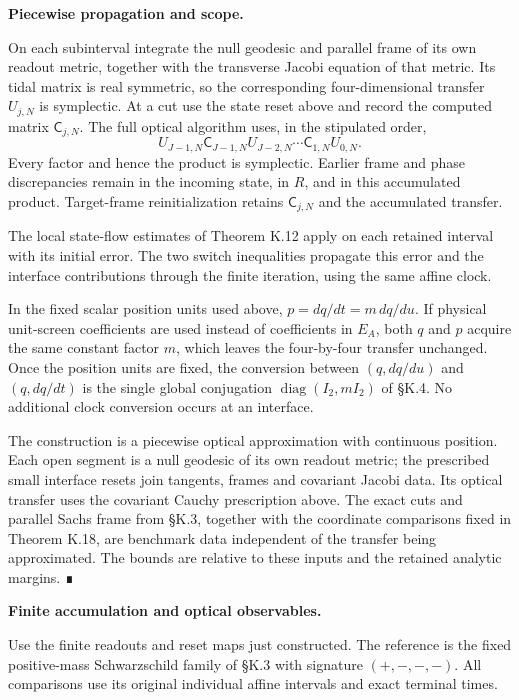 \documentclass[
  english,
  11pt,
  reqno]{amsart}
\begin{document}
\textbf{Piecewise propagation and scope.}

On each subinterval integrate the null geodesic and parallel frame of
its own readout metric, together with the transverse Jacobi equation of
that metric. Its tidal matrix is real symmetric, so the corresponding
four-dimensional transfer \(U_{j,N}\) is symplectic. At a cut use the
state reset above and record the computed matrix \(\mathsf C_{j,N}\).
The full optical algorithm uses, in the stipulated order, \[
 U_{J-1,N}\mathsf C_{J-1,N}U_{J-2,N}
       \cdots \mathsf C_{1,N}U_{0,N}.
\] Every factor and hence the product is symplectic. Earlier frame and
phase discrepancies remain in the incoming state, in \(R\), and in this
accumulated product. Target-frame reinitialization retains
\(\mathsf C_{j,N}\) and the accumulated transfer.

The local state-flow estimates of Theorem K.12 apply on each retained
interval with its initial error. The two switch inequalities propagate
this error and the interface contributions through the finite iteration,
using the same affine clock.

In the fixed scalar position units used above, \(p=dq/dt=m\,dq/du\). If
physical unit-screen coefficients are used instead of coefficients in
\(E_A\), both \(q\) and \(p\) acquire the same constant factor \(m\),
which leaves the four-by-four transfer unchanged. Once the position
units are fixed, the conversion between \((q,dq/du)\) and \((q,dq/dt)\)
is the single global conjugation \(\operatorname{diag}(I_2,mI_2)\) of
§K.4. No additional clock conversion occurs at an interface.

The construction is a piecewise optical approximation with continuous
position. Each open segment is a null geodesic of its own readout
metric; the prescribed small interface resets join tangents, frames and
covariant Jacobi data. Its optical transfer uses the covariant Cauchy
prescription above. The exact cuts and parallel Sachs frame from §K.3,
together with the coordinate comparisons fixed in Theorem K.18, are
benchmark data independent of the transfer being approximated. The
bounds are relative to these inputs and the retained analytic margins. ∎

\protect{}\label{sec:fro-c-accumulation}

\textbf{Finite accumulation and optical observables.}

Use the finite readouts and reset maps just constructed. The reference
is the fixed positive-mass Schwarzschild family of §K.3 with signature
\((+,-,-,-)\). All comparisons use its original individual affine
intervals and exact terminal times.
\end{document}
